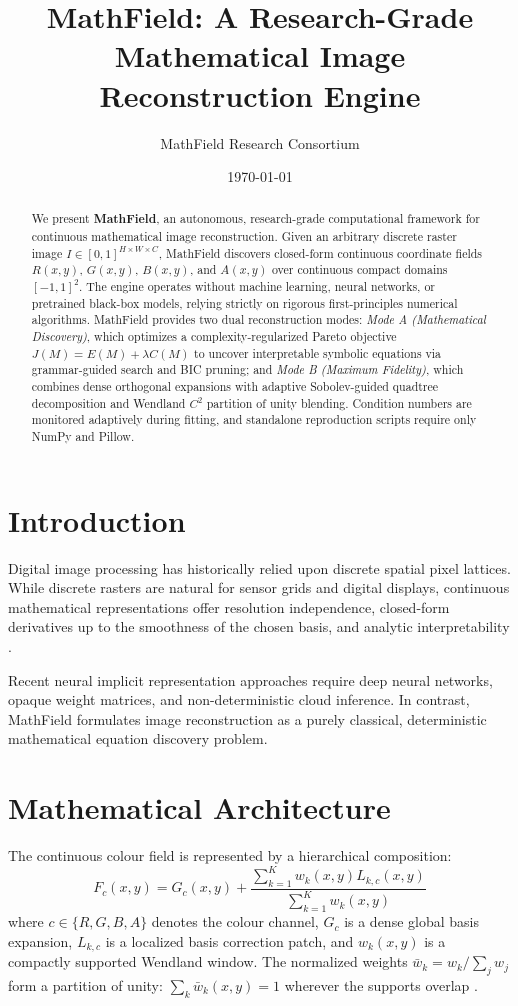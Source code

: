 \documentclass[11pt,a4paper]{article}
\title{MathField: A Research-Grade Mathematical Image Reconstruction Engine}
\author{MathField Research Consortium}
\date{\today}
\begin{document}
\maketitle

\begin{abstract}
We present \textbf{MathField}, an autonomous, research-grade computational framework for continuous mathematical image reconstruction. Given an arbitrary discrete raster image $I \in [0, 1]^{H \times W \times C}$, MathField discovers closed-form continuous coordinate fields $R(x, y)$, $G(x, y)$, $B(x, y)$, and $A(x, y)$ over continuous compact domains $[-1, 1]^2$. The engine operates without machine learning, neural networks, or pretrained black-box models, relying strictly on rigorous first-principles numerical algorithms. MathField provides two dual reconstruction modes: \emph{Mode A (Mathematical Discovery)}, which optimizes a complexity-regularized Pareto objective $J(M) = E(M) + \lambda C(M)$ to uncover interpretable symbolic equations via grammar-guided search and BIC pruning; and \emph{Mode B (Maximum Fidelity)}, which combines dense orthogonal expansions with adaptive Sobolev-guided quadtree decomposition and Wendland $C^2$ partition of unity blending. Condition numbers are monitored adaptively during fitting, and standalone reproduction scripts require only NumPy and Pillow.
\end{abstract}

\section{Introduction}
Digital image processing has historically relied upon discrete spatial pixel lattices. While discrete rasters are natural for sensor grids and digital displays, continuous mathematical representations offer resolution independence, closed-form derivatives up to the smoothness of the chosen basis, and analytic interpretability \cite{chebyshev1854theorie, mallat1989theory}. 

Recent neural implicit representation approaches require deep neural networks, opaque weight matrices, and non-deterministic cloud inference. In contrast, MathField formulates image reconstruction as a purely classical, deterministic mathematical equation discovery problem. 

\section{Mathematical Architecture}
The continuous colour field is represented by a hierarchical composition:
\begin{equation}
F_c(x, y) = G_c(x, y) + \frac{\sum_{k=1}^{K} w_k(x, y) L_{k, c}(x, y)}{\sum_{k=1}^{K} w_k(x, y)}
\end{equation}
where $c \in \{R, G, B, A\}$ denotes the colour channel, $G_c$ is a dense global basis expansion, $L_{k, c}$ is a localized basis correction patch, and $w_k(x, y)$ is a compactly supported Wendland window. The normalized weights $\bar w_k = w_k / \sum_j w_j$ form a partition of unity: $\sum_k \bar w_k(x, y) = 1$ wherever the supports overlap \cite{wendland1995piecewise}.
\end{document}
